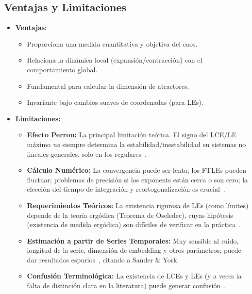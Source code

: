 \subsection{Ventajas y Limitaciones}
\begin{itemize}
    \item \textbf{Ventajas:}
    \begin{itemize}
        \item Proporciona una medida cuantitativa y objetiva del caos.
        \item Relaciona la dinámica local (expansión/contracción) con el comportamiento global.
        \item Fundamental para calcular la dimensión de atractores.
        \item Invariante bajo cambios suaves de coordenadas (para LEs).
    \end{itemize}
    \item \textbf{Limitaciones:}
    \begin{itemize}
        \item \textbf{Efecto Perron:} La principal limitación teórica. El signo del LCE/LE máximo \textit{no} siempre determina la estabilidad/inestabilidad en sistemas no lineales generales, solo en los regulares~\cite{Leonov2007, Kuznetsov2016}.
        \item \textbf{Cálculo Numérico:} La convergencia puede ser lenta; los FTLEs pueden fluctuar; problemas de precisión si los exponents están cerca o son cero; la elección del tiempo de integración y reortogonalización es crucial~\cite{Kuznetsov2016, Kuznetsov_2016}.
        \item \textbf{Requerimientos Teóricos:} La existencia rigurosa de LEs (como límites) depende de la teoría ergódica (Teorema de Oseledec), cuyas hipótesis (existencia de medida ergódica) son difíciles de verificar en la práctica~\cite{Kuznetsov2016}.
        \item \textbf{Estimación a partir de Series Temporales:} Muy sensible al ruido, longitud de la serie, dimensión de embedding y otros parámetros; puede dar resultados espurios~\cite{Kuznetsov2016}, citando a Sander \& York.
        \item \textbf{Confusión Terminológica:} La existencia de LCEs y LEs (y a veces la falta de distinción clara en la literatura) puede generar confusión~\cite{Kuznetsov2016}.
    \end{itemize}
\end{itemize}
